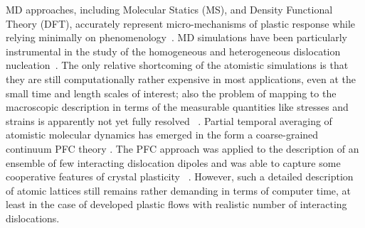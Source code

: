 \documentclass[CRPHYS,Unicode,manuscript]{cedram}
\begin{document}
MD approaches, including  Molecular Statics (MS), and Density Functional
Theory (DFT), accurately represent   micro-mechanisms of plastic response while  relying  minimally on phenomenology~\cite{Cia2012-pj}. 
MD simulations have been particularly   instrumental in the study of the homogeneous and heterogeneous dislocation nucleation~\cite{Miller2008-rr,Zepeda-Ruiz2017-gu,Parakh2020-mk}. 
The only  relative shortcoming of the  atomistic simulations  is that they are  still computationally rather expensive   in most applications, even at the small time and length scales of interest;  also  the problem of mapping to the macroscopic description in terms of the measurable quantities like stresses and strains  is  apparently  not yet  fully resolved ~\cite{Zimmerman2001-cz,Zimmerman2009-my,Zepeda-Ruiz2020-cl,Lim2018-bj}. Partial temporal averaging of   atomistic molecular dynamics has emerged in the form  a coarse-grained continuum  PFC theory    \cite{Elder2002-qt}. The PFC approach   was applied to the description of   an ensemble of few interacting dislocation dipoles and was able to  capture some cooperative features of crystal plasticity ~\cite{Chan2010-ha,Skaugen2018-rf,Salvalaglio2020-eb}. However,  such a detailed description of atomic lattices still remains rather demanding in terms of computer time, at least  in the case of  developed plastic  flows with realistic  number of interacting dislocations.
\end{document}
